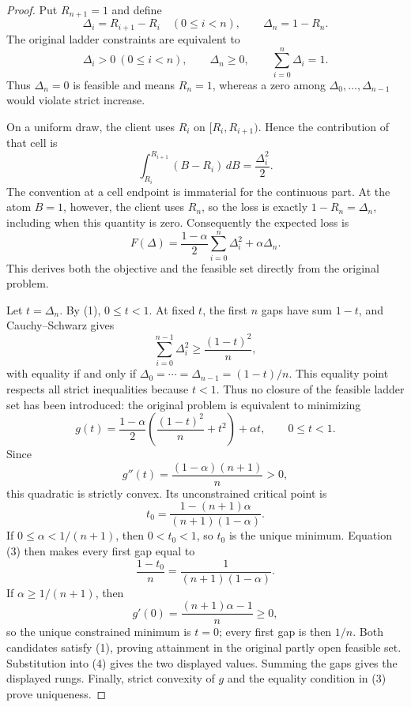 \documentclass[11pt]{article}
\begin{document}
\begin{proof}
Put \(R_{n+1}=1\) and define
\[
 \Delta_i=R_{i+1}-R_i\quad(0\leq i<n),
 \qquad \Delta_n=1-R_n.
\]
The original ladder constraints are equivalent to
\[
 \Delta_i>0\ (0\leq i<n),\qquad
 \Delta_n\geq0,\qquad
 \sum_{i=0}^{n}\Delta_i=1.                                      \tag{1}
\]
Thus \(\Delta_n=0\) is feasible and means \(R_n=1\), whereas a zero
among \(\Delta_0,\ldots,\Delta_{n-1}\) would violate strict increase.

On a uniform draw, the client uses \(R_i\) on
\([R_i,R_{i+1})\).  Hence the contribution of that cell is
\[
 \int_{R_i}^{R_{i+1}}(B-R_i)\,dB=\frac{\Delta_i^2}{2}.
\]
The convention at a cell endpoint is immaterial for the continuous part.
At the atom \(B=1\), however, the client uses \(R_n\), so the loss is exactly
\(1-R_n=\Delta_n\), including when this quantity is zero.  Consequently the
expected loss is
\[
 F(\Delta)=\frac{1-\alpha}{2}\sum_{i=0}^{n}\Delta_i^2
            +\alpha\Delta_n.                                   \tag{2}
\]
This derives both the objective and the feasible set directly from the
original problem.

Let \(t=\Delta_n\).  By (1), \(0\leq t<1\).  At fixed \(t\), the first
\(n\) gaps have sum \(1-t\), and Cauchy--Schwarz gives
\[
 \sum_{i=0}^{n-1}\Delta_i^2\geq\frac{(1-t)^2}{n},                \tag{3}
\]
with equality if and only if
\(
 \Delta_0=\cdots=\Delta_{n-1}=(1-t)/n.
\)
This equality point respects all strict inequalities because \(t<1\).
Thus no closure of the feasible ladder set has been introduced: the original
problem is equivalent to minimizing
\[
 g(t)=\frac{1-\alpha}{2}
      \left(\frac{(1-t)^2}{n}+t^2\right)+\alpha t,
 \qquad 0\leq t<1.                                               \tag{4}
\]
Since
\[
 g''(t)=\frac{(1-\alpha)(n+1)}{n}>0,
\]
this quadratic is strictly convex.  Its unconstrained critical point is
\[
 t_0=\frac{1-(n+1)\alpha}{(n+1)(1-\alpha)}.                      \tag{5}
\]
If \(0\leq\alpha<1/(n+1)\), then \(0<t_0<1\), so \(t_0\) is the unique
minimum.  Equation (3) then makes every first gap equal to
\[
 \frac{1-t_0}{n}=\frac{1}{(n+1)(1-\alpha)}.                      \tag{6}
\]
If \(\alpha\geq1/(n+1)\), then
\[
 g'(0)=\frac{(n+1)\alpha-1}{n}\geq0,
\]
so the unique constrained minimum is \(t=0\); every first gap is then
\(1/n\).  Both candidates satisfy (1), proving attainment in the original
partly open feasible set.  Substitution into (4) gives the two displayed
values.  Summing the gaps gives the displayed rungs.  Finally, strict
convexity of \(g\) and the equality condition in (3) prove uniqueness.
\end{proof}
\end{document}
